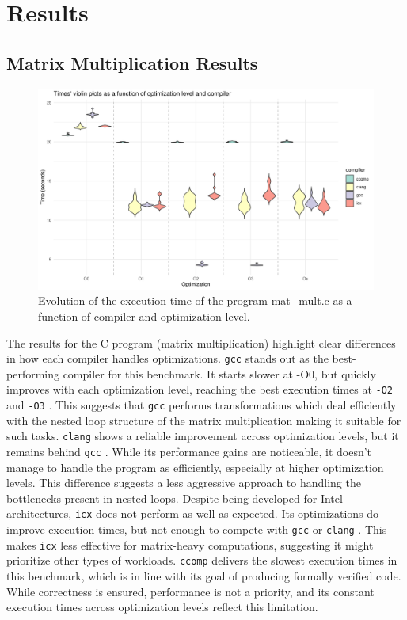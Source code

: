 \documentclass{rapport}
\newcommand{\gcc}{\texttt{gcc} }
\newcommand{\icx}{\texttt{icx} }
\newcommand{\clang}{\texttt{clang} }
\newcommand{\comp}{\texttt{ccomp} }
\newcommand{\optitwo}{\texttt{-O2} }
\newcommand{\optithree}{\texttt{-O3} }
\begin{document}
\section{Results}
\subsection{Matrix Multiplication Results}
\begin{figure}[H]
\centering
\includegraphics[width=1\textwidth]{img/plots/violin_plot_mat_mult.png}
\caption{Evolution of the execution time of the program mat\_mult.c as a function of compiler and optimization level.}
\label{fig:image1}
\end{figure}
The results for the C program (matrix multiplication) highlight clear differences in how each compiler handles optimizations.\newline
\gcc stands out as the best-performing compiler for this benchmark. It starts slower at -O0, but quickly improves with each optimization level, reaching the best execution times at 
\optitwo and \optithree. This suggests that \gcc performs transformations which deal efficiently with the nested loop structure of the matrix multiplication making it suitable for such tasks.
\newline
\clang shows a reliable improvement across optimization levels, but it remains behind \gcc. While its performance gains are noticeable, it doesn’t manage to handle the program as 
efficiently, especially at higher optimization levels. This difference suggests a less aggressive approach to handling the bottlenecks present in nested loops. \newline
Despite being developed for Intel architectures, \icx does not perform as well as expected. Its optimizations do improve execution times, but not enough to compete with \gcc or \clang. 
This makes \icx less effective for matrix-heavy computations, suggesting it might prioritize other types of workloads. \newline
\comp delivers the slowest execution times in this benchmark, which is in line with its goal of producing formally verified code. While correctness is ensured, 
performance is not a priority, and its constant execution times across optimization levels reflect this limitation.
\end{document}
